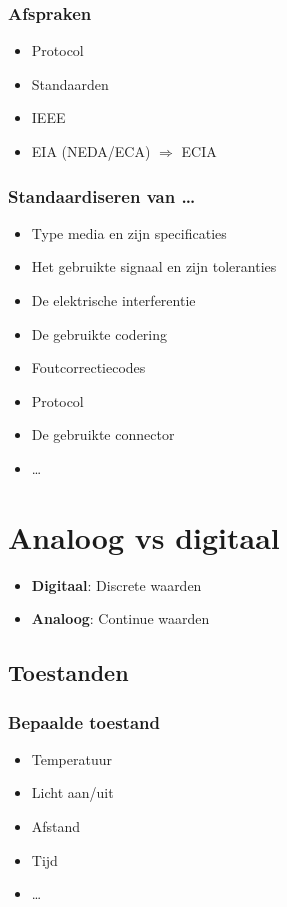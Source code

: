 \documentclass{article}
\newcommand{\bold}[1]{\textbf{#1}}
\begin{document}
\subsubsection{Afspraken}
\begin{itemize}
    \item Protocol
    \item Standaarden
    \item IEEE
    \item EIA (NEDA/ECA) $\Rightarrow$ ECIA
\end{itemize}

\subsubsection{Standaardiseren van \dots}
\begin{itemize}
    \item Type media en zijn specificaties
    \item Het gebruikte signaal en zijn toleranties
    \item De elektrische interferentie
    \item De gebruikte codering
    \item Foutcorrectiecodes
    \item Protocol
    \item De gebruikte connector
    \item \dots
\end{itemize}

\section{Analoog vs digitaal}
\begin{itemize}
    \item \bold{Digitaal}: Discrete waarden
    \item \bold{Analoog}: Continue waarden
\end{itemize}
\subsection{Toestanden}
\subsubsection{Bepaalde toestand}
\begin{itemize}
    \item Temperatuur
    \item Licht aan/uit
    \item Afstand
    \item Tijd
    \item \dots
\end{itemize}
\end{document}
